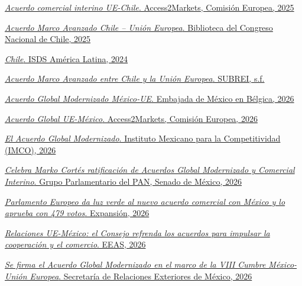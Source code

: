 \documentclass[10pt,a4paper]{article}
\begin{document}
\href{https://trade.ec.europa.eu/access-to-markets/es/content/acuerdo-comercial-interino-ue-chile}{\textit{Acuerdo comercial interino UE-Chile}. Access2Markets, Comisión Europea, 2025}

\href{https://obtienearchivo.bcn.cl/obtienearchivo?id=repositorio%2F10221%2F36448%2F1%2FBCN_Informe_AMA_Chile_UE.pdf}{\textit{Acuerdo Marco Avanzado Chile – Unión Europea}. Biblioteca del Congreso Nacional de Chile, 2025}

\href{https://isds-americalatina.org/chile/}{\textit{Chile}. ISDS América Latina, 2024}

\href{https://www.subrei.gob.cl/acuerdos-comerciales/modernizacion-ue-chile}{\textit{Acuerdo Marco Avanzado entre Chile y la Unión Europea}. SUBREI, s.f.}

\href{https://embamex.sre.gob.mx/belgica/index.php/es/avisos/670-agm}{\textit{Acuerdo Global Modernizado México-UE}. Embajada de México en Bélgica, 2026}

\href{https://trade.ec.europa.eu/access-to-markets/es/content/acuerdo-global-ue-mexico}{\textit{Acuerdo Global UE-México}. Access2Markets, Comisión Europea, 2026}

\href{https://imco.org.mx/el-acuerdo-global-modernizado/}{\textit{El Acuerdo Global Modernizado}. Instituto Mexicano para la Competitividad (IMCO), 2026}

\href{https://www.pan.senado.gob.mx/2026/07/celebra-marko-cortes-ratificacion-de-acuerdos-global-modernizado-y-comercial-interino-pero-senala-puntos-criticos-en-mexico-que-preocupan-a-la-ue/}{\textit{Celebra Marko Cortés ratificación de Acuerdos Global Modernizado y Comercial Interino}. Grupo Parlamentario del PAN, Senado de México, 2026}

\href{https://expansion.mx/economia/2026/07/08/parlamento-europeo-aprueba-acuerdo-modernizado-mexico}{\textit{Parlamento Europeo da luz verde al nuevo acuerdo comercial con México y lo aprueba con 479 votos}. Expansión, 2026}

\href{https://www.eeas.europa.eu/delegations/m%C3%A9xico/relaciones-ue-m%C3%A9xico-el-consejo-refrenda-los-acuerdos-para-impulsar-la-cooperaci%C3%B3n-y-el-comercio_es}{\textit{Relaciones UE-México: el Consejo refrenda los acuerdos para impulsar la cooperación y el comercio}. EEAS, 2026}

\href{https://www.gob.mx/sre/prensa/se-firma-el-acuerdo-global-modernizado-en-el-marco-de-la-viii-cumbre-mexico-union-europea}{\textit{Se firma el Acuerdo Global Modernizado en el marco de la VIII Cumbre México-Unión Europea}. Secretaría de Relaciones Exteriores de México, 2026}
\end{document}
